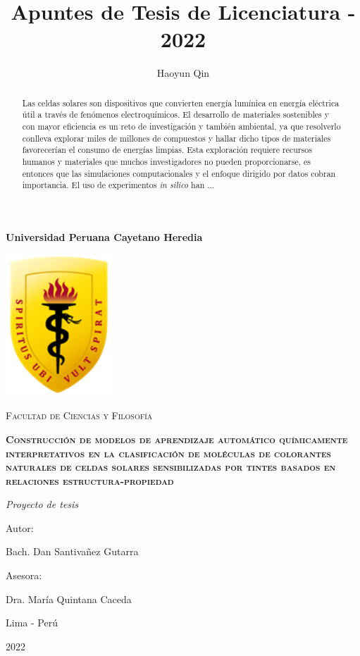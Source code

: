 \documentclass{article}
\title{Apuntes de Tesis de Licenciatura - 2022}
\author{Haoyun Qin}
\theoremstyle{mytheoremstyle}
\theoremstyle{mytheoremstyle}
\theoremstyle{myproblemstyle}
\begin{document}
    \begin{titlepage}
        \centering
        {\bfseries\LARGE Universidad Peruana Cayetano Heredia \par}
        \vspace{1cm}
        {\includegraphics[width=0.3\textwidth]{img/logo_escudo.png}\par}
        \vspace{1cm}
        {\scshape\Large Facultad de Ciencias y Filosofía \par}
        \vspace{1cm}
        {\bfseries\scshape\Large Construcción de modelos de aprendizaje automático químicamente interpretativos en la clasificación de moléculas de colorantes naturales de celdas solares sensibilizadas por tintes basados en relaciones estructura-propiedad \par}
        \vspace{1cm}
        {\itshape\Large Proyecto de tesis \par}
        \vfill
        {\Large Autor: \par}
        {\Large Bach. Dan Santivañez Gutarra\par}
        \vfill
        {\Large Asesora: \par}
        {\Large Dra. María Quintana Caceda \par}
        \vfill
        {\Large Lima - Perú \par}
        {\Large 2022 \par}
    \end{titlepage}

    \tableofcontents
    \newpage

    \begin{abstract}
        Las celdas solares son dispositivos que convierten energía lumínica en 
        energía eléctrica útil a través de fenómenos electroquímicos. El desarrollo
        de materiales sostenibles y con mayor eficiencia es un reto de investigación
        y también ambiental, ya que resolverlo conlleva explorar miles de millones de 
        compuestos y hallar dicho tipos de materiales favorecerían el consumo de 
        energías limpias. Esta exploración requiere recursos humanos y materiales que
        muchos investigadores no pueden proporcionarse, es entonces que las simulaciones
        computacionales y el enfoque dirigido por datos cobran importancia. El uso de 
        experimentos \textit{in silico} han ... 
    \end{abstract}
\end{document}
